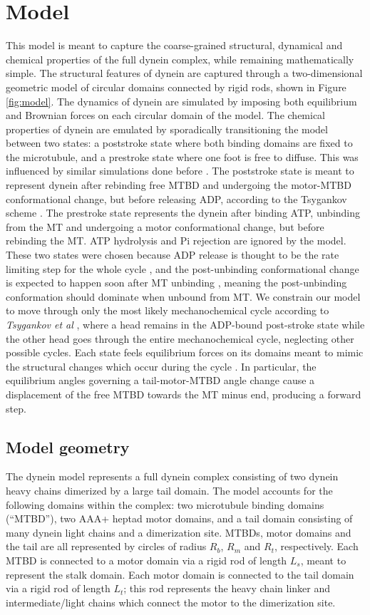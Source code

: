 \documentclass[9pt,twocolumn,twoside]{article}
\begin{document}
\section{Model}
This model is meant to capture the coarse-grained structural, dynamical and chemical properties of the full dynein complex, while remaining mathematically simple. The structural features of dynein are captured through a two-dimensional geometric model of circular domains connected by rigid rods, shown in Figure \ref{fig:model}. The dynamics of dynein are simulated by imposing both equilibrium and Brownian forces on each circular domain of the model. The chemical properties of dynein are emulated by sporadically transitioning the model between two states: a poststroke state where both binding domains are fixed to the microtubule, and a prestroke state where one foot is free to diffuse. This was influenced by similar simulations done before \cite{zhaomodel}. The poststroke state is meant to represent dynein after rebinding free MTBD and undergoing the motor-MTBD conformational change, but before releasing ADP, according to the Tsygankov scheme \cite{tsygankovscheme}. The prestroke state represents the dynein after binding ATP, unbinding from the MT and undergoing a motor conformational change, but before rebinding the MT. ATP hydrolysis and Pi rejection are ignored by the model. These two states were chosen because ADP release is thought to be the rate limiting step for the whole cycle \cite{holzbaur1989}, and the post-unbinding conformational change is expected to happen soon after MT unbinding \cite{mogamirate}, meaning the post-unbinding conformation should dominate when unbound from MT. We constrain our model to move through only the most likely mechanochemical cycle according to \textit{Tsygankov et al} \cite{tsygankovscheme}, where a head remains in the ADP-bound post-stroke state while the other head goes through the entire mechanochemical cycle, neglecting other possible cycles. Each state feels equilibrium forces on its domains meant to mimic the structural changes which occur during the cycle \cite{burgess-paper, burgessknight}. In particular, the equilibrium angles governing a tail-motor-MTBD angle change cause a displacement of the free MTBD towards the MT minus end, producing a forward step.

\subsection*{Model geometry}
The dynein model represents a full dynein complex consisting of two dynein heavy chains dimerized by a large tail domain. The model accounts for the following domains within the complex: two microtubule binding domains (``MTBD''), two AAA+ heptad motor domains, and a tail domain consisting of many dynein light chains and a dimerization site. MTBDs, motor domains and the tail are all represented by circles of radius $R_b$, $R_m$ and $R_t$, respectively. Each MTBD is connected to a motor domain via a rigid rod of length $L_s$, meant to represent the stalk domain. Each motor domain is connected to the tail domain via a rigid rod of length $L_t$; this rod represents the heavy chain linker and intermediate/light chains which connect the motor to the dimerization site.
\end{document}
